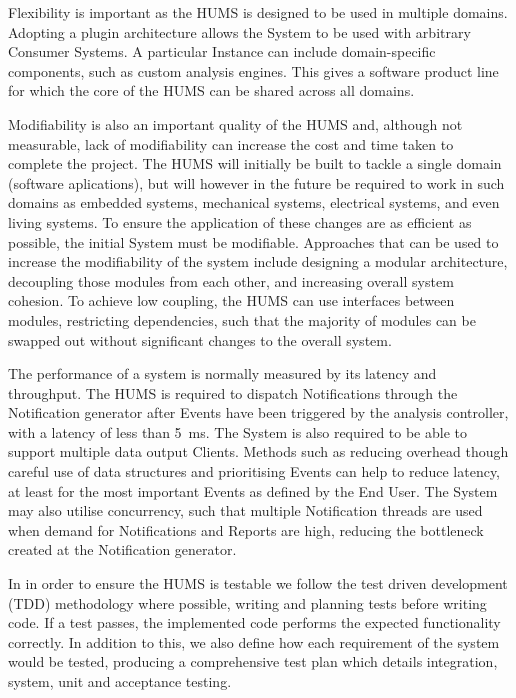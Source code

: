 \documentclass[10pt,a4paper]{article}
\begin{document}
Flexibility is important as the HUMS is designed to be used in multiple 
domains. Adopting a plugin architecture allows the System to be used with
arbitrary Consumer Systems. A particular Instance can include domain-specific
components, such as custom analysis engines. This gives a software product line
for which the core of the HUMS can be shared across all domains.

Modifiability is also an important quality of the HUMS and, although not 
measurable, lack of modifiability can increase the cost and time taken to 
complete the project. The HUMS will initially be built to tackle a single 
domain (software aplications), but will however in the future be required to
work in such domains as embedded systems, mechanical systems, electrical systems,
and even living systems. To ensure the application of these changes are
as efficient as possible, the initial System must be modifiable. Approaches that
can be used to increase the modifiability of the system include designing a
modular architecture, decoupling those modules from each other, and increasing
overall system cohesion. To achieve low coupling, the HUMS can use interfaces
between modules, restricting dependencies, such that the majority of modules can
be swapped out without significant changes to the overall system.

The performance of a system is normally measured by its latency and 
throughput. The HUMS is required to dispatch Notifications through the 
Notification generator after Events have been triggered by the analysis 
controller, with a latency of less than 5~ms. The System is also required to be
able to support multiple data output Clients. Methods such as reducing
overhead though careful use of data structures and prioritising Events can
help to reduce latency, at least for the most important Events as defined by the
End User. The System may also utilise concurrency, such that multiple
Notification threads are used when demand for Notifications and Reports are
high, reducing the bottleneck created at the Notification generator.

In in order to ensure the HUMS is testable we follow the test driven 
development (TDD) methodology where possible, writing and planning tests 
before writing code. If a test passes, the implemented code performs the 
expected functionality correctly. In addition to this, we also define how 
each requirement of the system would be tested, producing a 
comprehensive test plan which details integration, system, unit and 
acceptance testing.
\end{document}
